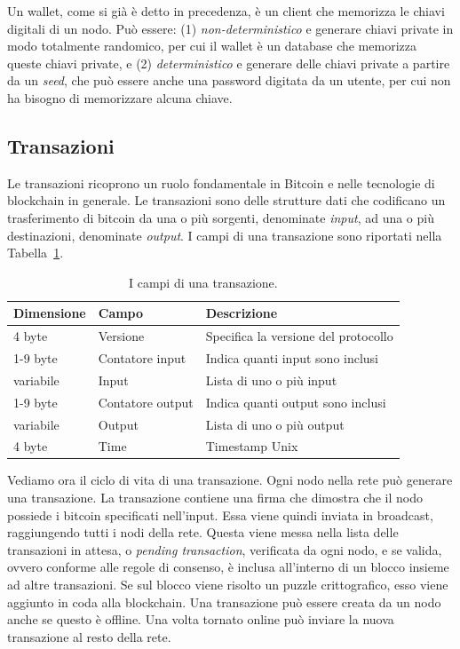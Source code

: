 Un wallet, come si già è detto in precedenza, è un client che memorizza le chiavi digitali di un nodo. Può essere: (1) \emph{non-deterministico} e generare chiavi private in modo totalmente randomico, per cui il wallet è un database che memorizza queste chiavi private, e (2) \emph{deterministico} e generare delle chiavi private a partire da un \emph{seed}, che può essere anche una password digitata da un utente, per cui non ha bisogno di memorizzare alcuna chiave.


\subsection{Transazioni}

Le transazioni ricoprono un ruolo fondamentale in Bitcoin e nelle tecnologie di blockchain in generale. Le transazioni sono delle strutture dati che codificano un trasferimento di bitcoin da una o più sorgenti, denominate \emph{input}, ad una o più destinazioni, denominate \emph{output}. I campi di una transazione sono riportati nella Tabella~\ref{tab:tx_fields}.

\begin{table}
	\centering
	\begin{tabular}{lll}
		\toprule
		Dimensione&Campo&Descrizione\\
		\midrule
		4 byte&Versione&Specifica la versione del protocollo\\
		1-9 byte&Contatore input&Indica quanti input sono inclusi\\
		variabile&Input&Lista di uno o più input\\
		1-9 byte&Contatore output&Indica quanti output sono inclusi\\
		variabile&Output&Lista di uno o più output\\
		4 byte&Time&Timestamp Unix\\
		\bottomrule
	\end{tabular}
	\caption{I campi di una transazione.}
	\label{tab:tx_fields}
\end{table}

Vediamo ora il ciclo di vita di una transazione. Ogni nodo nella rete può generare una transazione. La transazione contiene una firma che dimostra che il nodo possiede i bitcoin specificati nell'input. Essa viene quindi inviata in broadcast, raggiungendo tutti i nodi della rete. Questa viene messa nella lista delle transazioni in attesa, o \emph{pending transaction}, verificata da ogni nodo, e se valida, ovvero conforme alle regole di consenso, è inclusa all'interno di un blocco insieme ad altre transazioni. Se sul blocco viene risolto un puzzle crittografico, esso viene aggiunto in coda alla blockchain. Una transazione può essere creata da un nodo anche se questo è offline. Una volta tornato online può inviare la nuova transazione al resto della rete.

